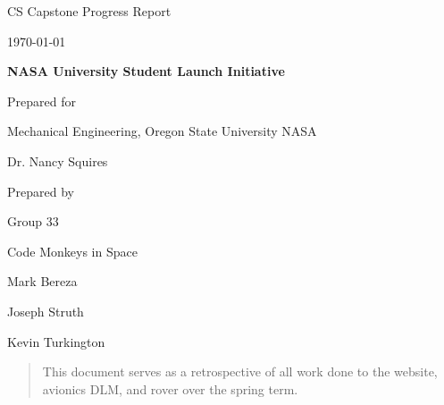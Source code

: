 \documentclass[onecolumn, draftclsnofoot, 10pt, compsoc]{IEEEtran}
\def \CapstoneTeamName{Code Monkeys in Space}
\def \CapstoneTeamNumber{		33}
\def \GroupMemberOne{			Mark Bereza}
\def \GroupMemberTwo{			Joseph Struth}
\def \GroupMemberThree{			Kevin Turkington}
\def \CapstoneProjectName{		NASA University Student Launch Initiative}
\def \CapstoneSponsorCompany{	Mechanical Engineering, Oregon State University NASA}
\def \CapstoneSponsorPerson{		Dr. Nancy Squires}
\def \DocType{	%
				Progress Report
				}
\newcommand{\NameSigPair}[1]{\par
\makebox[2.75in][r]{#1} \hfil 	\makebox[3.25in]{\makebox[2.25in]{\hrulefill} \hfill		\makebox[.75in]{\hrulefill}}
\par\vspace{-12pt} \textit{\tiny\noindent
\makebox[2.75in]{} \hfil		\makebox[3.25in]{\makebox[2.25in][r]{Signature} \hfill	\makebox[.75in][r]{Date}}}}
\renewcommand{\NameSigPair}[1]{#1}
\begin{document}
\begin{titlepage}
    \begin{singlespace}
        \hfill 
        \par\vspace{.2in}
        \centering
        \scshape{
            \huge CS Capstone \DocType \par
            {\large\today}\par
            \vspace{.5in}
            \textbf{\Huge\CapstoneProjectName}\par
            \vfill
            {\large Prepared for}\par
            \Huge \CapstoneSponsorCompany\par
            \vspace{5pt}
            {\Large\NameSigPair{\CapstoneSponsorPerson}\par}
            {\large Prepared by }\par
            Group\CapstoneTeamNumber\par
            \CapstoneTeamName\par 
            \vspace{5pt}
            {\Large
                \NameSigPair{\GroupMemberOne}\par
                \NameSigPair{\GroupMemberTwo}\par
                \NameSigPair{\GroupMemberThree}\par
            }
            \vspace{20pt}
        }
        \begin{abstract}
        	This document serves as a retrospective of all work done to the website, avionics DLM, and rover over the spring term.
        \end{abstract}     
    \end{singlespace}
\end{titlepage}
\newpage
{}
\tableofcontents
\clearpage

\end{document}
